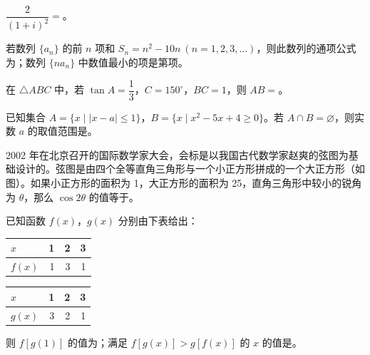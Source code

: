 \begin{question}
$\dfrac{2}{(1+i)^2}=$\gkblank{}。

\end{question}
\begin{question}
若数列 $\{a_n\}$ 的前 $n$ 项和 $S_n=n^2-10n\ (n=1,2,3,\ldots)$，则此数列的通项公式为\gkblank{}；数列 $\{na_n\}$ 中数值最小的项是第\gkblank{}项。

\end{question}
\begin{question}
在 $\triangle ABC$ 中，若 $\tan A=\dfrac13$，$C=150^\circ$，$BC=1$，则 $AB=$\gkblank{}。

\end{question}
\begin{question}
已知集合 $A=\{x\mid |x-a|\leq 1\}$，$B=\{x\mid x^2-5x+4\geq 0\}$。若 $A\cap B=\varnothing$，则实数 $a$ 的取值范围是\gkblank{}。

\Needspace{0.4\textheight}
\end{question}
\begin{question}
2002 年在北京召开的国际数学家大会，会标是以我国古代数学家赵爽的弦图为基础设计的。弦图是由四个全等直角三角形与一个小正方形拼成的一个大正方形（如图）。如果小正方形的面积为 1，大正方形的面积为 25，直角三角形中较小的锐角为 $\theta$，那么 $\cos 2\theta$ 的值等于\gkblank{}。
\nopagebreak[4]
\begin{center}\end{center}
\nopagebreak[4]
\end{question}
\begin{question}
已知函数 $f(x)$，$g(x)$ 分别由下表给出：

\begin{center}
\begin{tabular}{lrrr}
\toprule
$x$ & 1 & 2 & 3 \\
\midrule
$f(x)$ & 1 & 3 & 1 \\
\bottomrule
\end{tabular}
\end{center}

\begin{center}
\begin{tabular}{lrrr}
\toprule
$x$ & 1 & 2 & 3 \\
\midrule
$g(x)$ & 3 & 2 & 1 \\
\bottomrule
\end{tabular}
\end{center}

则 $f[g(1)]$ 的值为\gkblank{}；满足 $f[g(x)]>g[f(x)]$ 的 $x$ 的值是\gkblank{}。

\end{question}

